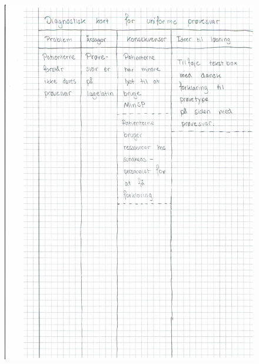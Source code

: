 \begin{figure}[H]
	\centering
	\includegraphics[angle=0, height=1.05\textheight]{Materials/DV_Kort5.pdf}
	\label{fig:DVkort5}
\end{figure}

